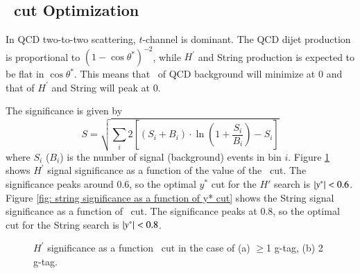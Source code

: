 \subsection{\ystar\ cut Optimization}
\label{section:ystarCutOptimization}


In QCD two-to-two scattering, $t$-channel is dominant. The QCD dijet production is proportional to 
$\displaystyle{(1-\cos\theta^{*})^{-2}}$, while $H^\prime$ and String production is expected to be flat in 
$\cos\theta^{*}$. This means that \ystar\  of QCD background will minimize at 0 and that of $H^\prime$  
and String will peak at 0.


The significance is given by 
\begin{equation}
\label{eq:signifcanceYstar}
S  = \sqrt{\sum_{i}{2\left[ \left(S_{i}+B_{i} \right)\cdot \ln \left(1+\frac{S_{i}}{B_{i}}\right)-S_{i}\right]}}
\end{equation}
where $S_i$ ($B_i$) is the number of signal (background) events in bin $i$. 
Figure \ref{fig: hprime significance as a function of y* cut} shows $H^\prime$ signal significance as a function 
of the value of the \ystar\  cut. The significance peaks  around 0.6, so the optimal $y^{*}$ cut for the $H'$ search is 
$|y^\ast| < 0.6$. Figure \ref{fig: string significance as a function of y* cut} shows the String signal significance as a function of \ystar\ cut. The significance peaks at  0.8, so the optimal  cut for the String search is $|y^\ast| < 0.8$.

\begin{figure}[htbp]
        \centering
        \caption{$H^\prime$ significance as a function \ystar\ cut in the case of (a) $\geq$1 g-tag, (b) 2 g-tag.}
        \label{fig: hprime significance as a function of y* cut}
\end{figure}


